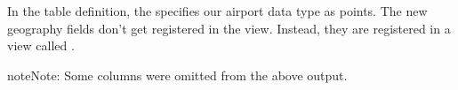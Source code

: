 \documentclass[a4paper,11pt,english]{sphinxmanual}
\begin{document}
In the table definition, the  specifies our airport data type as points. The new geography fields don’t get registered in the  view. Instead, they are registered in a view called .

\begin{sphinxVerbatim}[commandchars=\\\{\}]
   
\end{sphinxVerbatim}

\begin{sphinxVerbatim}[commandchars=\\\{\}]
                     
                        
                                     
\end{sphinxVerbatim}

\begin{sphinxadmonition}{note}{Note:}
Some columns were omitted from the above output.
\end{sphinxadmonition}
\end{document}

